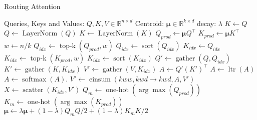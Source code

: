 \documentclass[a4paper]{article}
\begin{document}
\begin{algorithm}
\caption{Routing Attention}\label{alg:routing}
\begin{algorithmic}[1]
\State Queries, Keys and Values: $Q, K, V \in \mathbb{R}^{n \times d}$
\State Centroid: \(\bm{\mu} \in \mathbb{R}^{k \times d}\)
\State decay: \(\lambda\)
\State $K \gets Q$
\EndIf
{}
\State $Q \gets \operatorname{LayerNorm}(Q)$ 
\State $K \gets \operatorname{LayerNorm}(K)$ 
\State $Q_{prod} \gets \bm{\mu} Q^\top$ 
\State $K_{prod} \gets \bm{\mu} K^\top$ 
\EndIf
\State \(w \gets n/k\) 
\State $Q_{idx} \gets \operatorname{top-k}(Q_{prod}, w) $ 
\State $Q_{idx} \gets \operatorname{sort}(Q_{idx})$ 
\State $K_{idx} \gets Q_{idx} $ 
\State $K_{idx} \gets \operatorname{top-k}(K_{prod}, w) $ 
\State $K_{idx} \gets \operatorname{sort}(K_{idx})$ 
\EndIf
\State \(Q' \gets \operatorname{gather}(Q, Q_{idx})\) 
\State \(K' \gets \operatorname{gather}(K, K_{idx})\) 
\State \(V' \gets \operatorname{gather}(V, K_{idx})\) 
\State $A \gets Q' (K')^\top$ 
\State \(A \gets \operatorname{ltr}(A)\)
\EndIf
\State $A \gets \operatorname{softmax}(A)$. 
\State \(V' \gets \operatorname{einsum}(kww, kwd \rightarrow kwd, A, V')\)
\State \(X \gets \operatorname{scatter}(K_{idx}, V')\) 
\State $Q_m \gets \operatorname{one-hot}(\arg\max(Q_{prod}))$ 
\State $K_m \gets \operatorname{one-hot}(\arg\max(K_{prod}))$ 
\State $\bm{\mu} \gets \lambda \bm{\mu} + (1 - \lambda)Q_mQ/2 + (1 - \lambda)K_mK/2$
\State {}
\end{algorithmic}
\end{algorithm}
\end{document}
